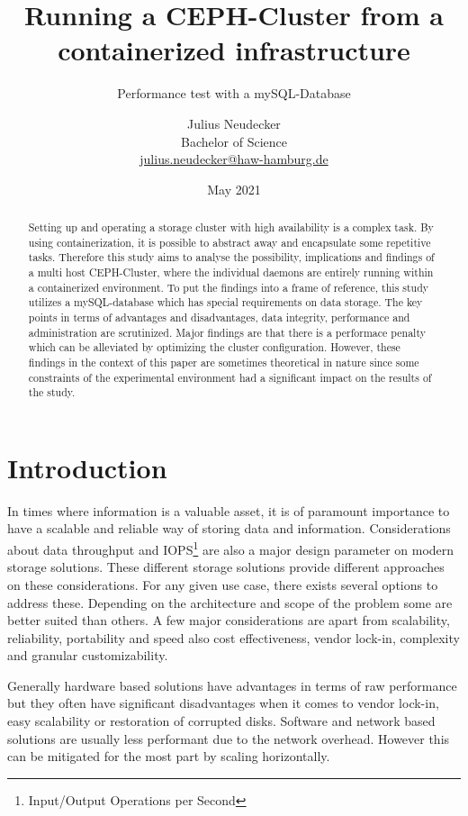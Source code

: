 \documentclass[titlepage, a4paper, 11pt]{scrartcl}
\title{Running a CEPH-Cluster from a containerized infrastructure}
\subtitle{Performance test with a mySQL-Database}
\author{Julius Neudecker \\ Bachelor of Science \\ \href{mailto:julius.neudecker@haw-hamburg.de}{julius.neudecker@haw-hamburg.de}}
\date{May 2021}
\begin{document}
    \maketitle

    \tableofcontents

    \begin{abstract}

        Setting up and operating a storage cluster with high availability is a complex task. 
        By using containerization, it is possible to abstract away and encapsulate some repetitive tasks.
        Therefore this study aims to analyse the possibility, implications and findings of a multi host
        CEPH-Cluster, where the individual daemons are entirely running within a containerized environment.
        To put the findings into a frame of reference, this study utilizes a mySQL-database which has 
        special requirements on data storage. The key points in terms of advantages and disadvantages,
        data integrity, performance and administration are scrutinized. Major findings are that there is a performace penalty which can be alleviated by optimizing the cluster configuration. However, these findings in the context of this paper are sometimes theoretical in nature since some constraints of the experimental environment had a significant impact on the results of the study.

    \end{abstract}

    \section{Introduction}

        In times where information is a valuable asset, it is of paramount importance to have a scalable and reliable
        way of storing data and information. Considerations about data throughput and 
        IOPS\footnote{Input/Output Operations per Second} are also a major design parameter on modern storage solutions.
        These different storage solutions provide different approaches on these considerations. For any given use case, there
        exists several options to address these. Depending on the architecture and scope of the problem some are better
        suited than others. A few major considerations are apart from scalability, reliability, portability and speed also cost effectiveness, vendor lock-in, complexity and granular customizability.

        Generally hardware based solutions have advantages in terms of raw performance but they often have significant disadvantages
        when it comes to vendor lock-in, easy scalability or restoration of corrupted disks. Software and network based solutions are
        usually less performant due to the network overhead. However this can be mitigated for the most part by scaling horizontally.
\end{document}
